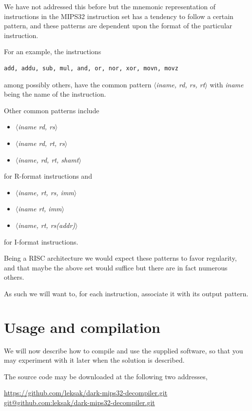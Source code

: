 \documentclass[a4paper]{article}
\begin{document}
We have not addressed this before but the mnemonic representation of
instructions in the MIPS32 instruction set has a tendency to follow a
certain pattern, and these patterns are dependent upon the format of
the particular instruction.

For an example, the instructions

\begin{verbatim}
add, addu, sub, mul, and, or, nor, xor, movn, movz
\end{verbatim}

\newcommand{\pattern}[1]{\emph{$\langle$#1$\rangle$}}
among possibly others, have the common pattern \pattern{iname, rd, rs,
rt} with \emph{iname} being the name of the instruction.

Other common patterns include 

\begin{itemize}
\item \pattern{iname rd, rs}
\item \pattern{iname rd, rt, rs}
\item \pattern{iname, rd, rt, shamt}
\end{itemize}

for R-format instructions and

\begin{itemize}
\item \pattern{iname, rt, rs, imm}
\item \pattern{iname rt, imm}
\item \pattern{iname, rt, rs(addr)}
\end{itemize}

for I-format instructions.

Being a RISC architecture we would expect these patterns to favor
regularity, and that maybe the above set would suffice but there
are in fact numerous others.

As such we will want to, for each instruction, associate it with its
output pattern.

\section{Usage and compilation}

We will now describe how to compile and use the supplied software,
so that you may experiment with it later when the solution is
described.

The source code may be downloaded at the following two addresses,

\begin{center}
\url{https://github.com/leksak/dark-mips32-decompiler.git} \\
\url{git@github.com:leksak/dark-mips32-decompiler.git}
\end{center}
\end{document}
